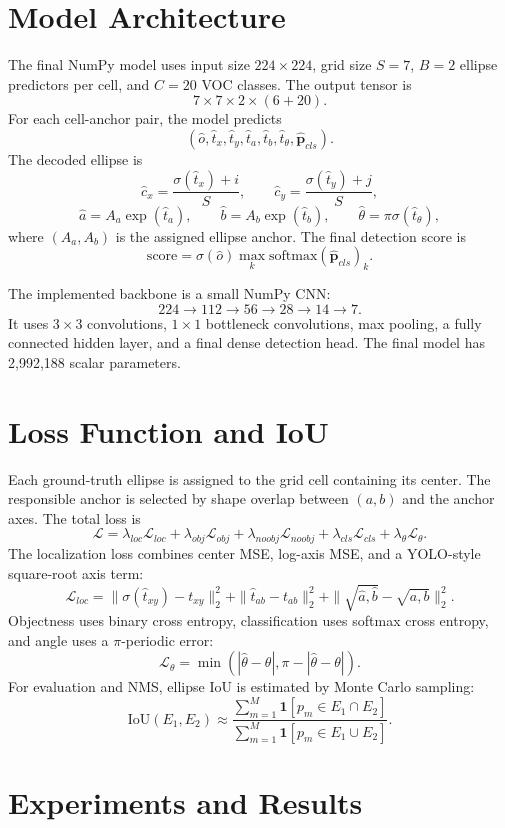 \documentclass[10pt]{article}
\begin{document}
\section{Model Architecture}
The final NumPy model uses input size $224\times224$, grid size $S=7$, $B=2$ ellipse predictors per cell, and $C=20$ VOC classes. The output tensor is
\[
7\times7\times2\times(6+20).
\]
For each cell-anchor pair, the model predicts
\[
(\hat{o},\hat{t}_x,\hat{t}_y,\hat{t}_a,\hat{t}_b,\hat{t}_{\theta},\hat{\mathbf{p}}_{cls}).
\]
The decoded ellipse is
\[
\hat{c}_x=\frac{\sigma(\hat{t}_x)+i}{S},\qquad
\hat{c}_y=\frac{\sigma(\hat{t}_y)+j}{S},
\]
\[
\hat{a}=A_a\exp(\hat{t}_a),\qquad
\hat{b}=A_b\exp(\hat{t}_b),\qquad
\hat{\theta}=\pi\sigma(\hat{t}_{\theta}),
\]
where $(A_a,A_b)$ is the assigned ellipse anchor. The final detection score is
\[
\text{score}=\sigma(\hat{o})\max_k \text{softmax}(\hat{\mathbf{p}}_{cls})_k.
\]

The implemented backbone is a small NumPy CNN:
\[
224\rightarrow112\rightarrow56\rightarrow28\rightarrow14\rightarrow7.
\]
It uses $3\times3$ convolutions, $1\times1$ bottleneck convolutions, max pooling, a fully connected hidden layer, and a final dense detection head. The final model has 2,992,188 scalar parameters.

\section{Loss Function and IoU}
Each ground-truth ellipse is assigned to the grid cell containing its center. The responsible anchor is selected by shape overlap between $(a,b)$ and the anchor axes. The total loss is
\[
\mathcal{L}=
\lambda_{loc}\mathcal{L}_{loc}
+\lambda_{obj}\mathcal{L}_{obj}
+\lambda_{noobj}\mathcal{L}_{noobj}
+\lambda_{cls}\mathcal{L}_{cls}
+\lambda_{\theta}\mathcal{L}_{\theta}.
\]
The localization loss combines center MSE, log-axis MSE, and a YOLO-style square-root axis term:
\[
\mathcal{L}_{loc}
=\|\sigma(\hat{t}_{xy})-t_{xy}\|_2^2
+\|\hat{t}_{ab}-t_{ab}\|_2^2
+\|\sqrt{\hat{a},\hat{b}}-\sqrt{a,b}\|_2^2.
\]
Objectness uses binary cross entropy, classification uses softmax cross entropy, and angle uses a $\pi$-periodic error:
\[
\mathcal{L}_{\theta}=\min(|\hat{\theta}-\theta|,\pi-|\hat{\theta}-\theta|).
\]
For evaluation and NMS, ellipse IoU is estimated by Monte Carlo sampling:
\[
\text{IoU}(E_1,E_2)\approx
\frac{\sum_{m=1}^{M}\mathbf{1}[p_m\in E_1\cap E_2]}
{\sum_{m=1}^{M}\mathbf{1}[p_m\in E_1\cup E_2]}.
\]

\section{Experiments and Results}
\end{document}
